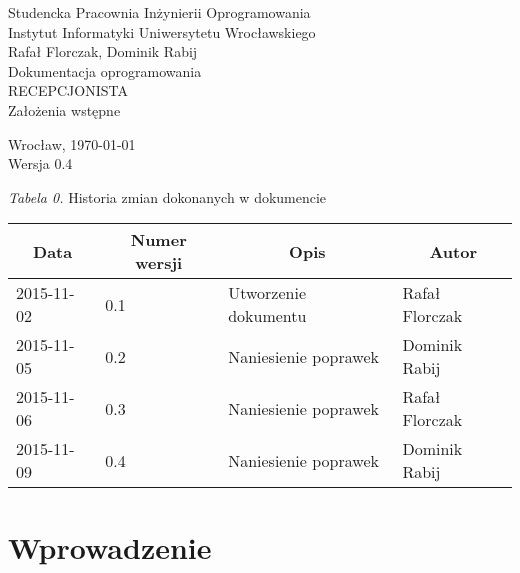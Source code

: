 \documentclass [11pt, a4paper, leqno] {article}
\begin{document}

\begin{center}
  \thispagestyle{empty} %
  {\large Studencka Pracownia Inżynierii Oprogramowania} \\ [0.5cm]
	{\large Instytut Informatyki Uniwersytetu Wrocławskiego} \\ [6.0cm]

  {\large Rafał Florczak, Dominik Rabij} \\ [1.5cm]

	{\huge Dokumentacja oprogramowania} \\ [0.5cm]
  {\huge RECEPCJONISTA} \\ [1.5cm]

  {\large Założenia wstępne} \\ [0.5cm]

  \vfill
  
  {\large Wrocław, \today} \\ [0.5cm]
  {\large Wersja 0.4}
\end{center}

\newpage


\textit{Tabela 0.} Historia zmian dokonanych w dokumencie

\begin{center}
  \begin{tabular}{| l | l | l | l |}
    \hline
    \multicolumn{1}{|c|}{Data} & 
    \multicolumn{1}{|c|}{Numer wersji} &  
    \multicolumn{1}{|c|}{Opis} &
    \multicolumn{1}{|c|}{Autor} \\ \hline \hline
    2015-11-02 & 0.1 & Utworzenie dokumentu & Rafał Florczak \\ \hline
    2015-11-05 & 0.2 & Naniesienie poprawek & Dominik Rabij\\ \hline
    2015-11-06 & 0.3 & Naniesienie poprawek & Rafał Florczak\\ \hline
    2015-11-09 & 0.4 & Naniesienie poprawek & Dominik Rabij\\ \hline
  \end{tabular}
\end{center}

\medskip

\tableofcontents

\newpage

\section{Wprowadzenie}
\end{document}
